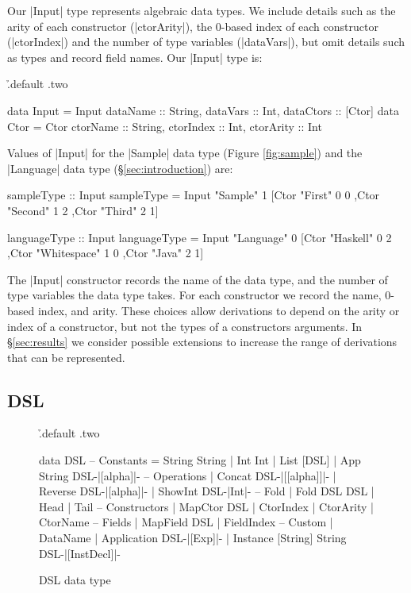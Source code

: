 \documentclass[preprint,draft]{sigplanconf}
\begin{document}
Our |Input| type represents algebraic data types. We include details such as the arity of each constructor (|ctorArity|), the 0-based index of each constructor (|ctorIndex|) and the number of type variables (|dataVars|), but omit details such as types and record field names. Our |Input| type is:

\h{.default .two}\begin{code}
data Input = Input
    {dataName :: String, dataVars :: Int, dataCtors :: [Ctor]}
data Ctor = Ctor
    {ctorName :: String, ctorIndex :: Int, ctorArity :: Int}
\end{code}

\noindent Values of |Input| for the |Sample| data type (Figure \ref{fig:sample}) and the |Language| data type (\S\ref{sec:introduction}) are:

\begin{code}
sampleType :: Input
sampleType = Input "Sample" 1
    [Ctor "First"   0 0
    ,Ctor "Second"  1 2
    ,Ctor "Third"   2 1]

languageType :: Input
languageType = Input "Language" 0
    [Ctor "Haskell"     0 2
    ,Ctor "Whitespace"  1 0
    ,Ctor "Java"        2 1]
\end{code}

The |Input| constructor records the name of the data type, and the number of type variables the data type takes. For each constructor we record the name, 0-based index, and arity. These choices allow derivations to depend on the arity or index of a constructor, but not the types of a constructors arguments. In \S\ref{sec:results} we consider possible extensions to increase the range of derivations that can be represented.

\subsection{DSL}

\begin{figure}
\h{.default .two}\begin{code}
data DSL
       -- Constants
    =  String String
    |  Int Int
    |  List [DSL]
    |  App String DSL{-|[alpha]|-}
       -- Operations
    |  Concat DSL{-|[[alpha]]|-}
    |  Reverse DSL{-|[alpha]|-}
    |  ShowInt DSL{-|Int|-}
       -- Fold
    |  Fold DSL DSL
    |  Head
    |  Tail
       -- Constructors
    |  MapCtor DSL
    |  CtorIndex
    |  CtorArity
    |  CtorName
       -- Fields
    |  MapField DSL
    |  FieldIndex
       -- Custom
    |  DataName
    |  Application DSL{-|[Exp]|-}
    |  Instance [String] String DSL{-|[InstDecl]|-}
\end{code}
\caption{DSL data type}
\label{fig:dsl}
\end{figure}
\end{document}
